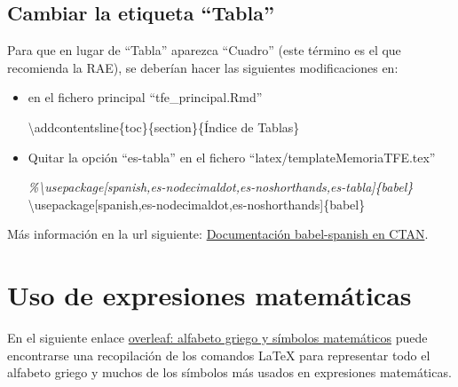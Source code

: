 \documentclass[12pt,a4paper,]{book}
\newenvironment{Shaded}{\begin{snugshade}}{\end{snugshade}}
\newcommand{\BuiltInTok}[1]{#1}
\newcommand{\CommentTok}[1]{\textcolor[rgb]{0.56,0.35,0.01}{\textit{#1}}}
\newcommand{\ExtensionTok}[1]{#1}
\newcommand{\FunctionTok}[1]{\textcolor[rgb]{0.00,0.00,0.00}{#1}}
\newcommand{\NormalTok}[1]{#1}
\numberwithin{dummy}{section}
\theoremstyle{ocrenumbox}
\theoremstyle{blacknumex}
\theoremstyle{blacknumbox}
\theoremstyle{ocrenum}
\theoremstyle{ocrenum}
\begin{document}
\clearpage

\hypertarget{cambiar-la-etiqueta-tabla}{%
\subsection{Cambiar la etiqueta
``Tabla''}\label{cambiar-la-etiqueta-tabla}}

Para que en lugar de ``Tabla'' aparezca ``Cuadro'' (este término es el
que recomienda la RAE), se deberían hacer las siguientes modificaciones
en:

\begin{itemize}
\item
  en el fichero principal ``tfe\_principal.Rmd''

\begin{Shaded}
\begin{Highlighting}[]
\FunctionTok{\textbackslash{}addcontentsline}\NormalTok{\{toc\}\{section\}\{Índice de Tablas\}}
\end{Highlighting}
\end{Shaded}
\item
  Quitar la opción ``es-tabla'' en el fichero
  ``latex/templateMemoriaTFE.tex''

\begin{Shaded}
\begin{Highlighting}[]
\CommentTok{\%\textbackslash{}usepackage[spanish,es{-}nodecimaldot,es{-}noshorthands,es{-}tabla]\{babel\}}
\BuiltInTok{\textbackslash{}usepackage}\NormalTok{[spanish,es{-}nodecimaldot,es{-}noshorthands]\{}\ExtensionTok{babel}\NormalTok{\}}
\end{Highlighting}
\end{Shaded}
\end{itemize}

Más información en la url siguiente:
\href{https://osl.ugr.es/CTAN/macros/latex/contrib/babel-contrib/spanish/spanish.pdf}{Documentación
babel-spanish en CTAN}.

\hypertarget{uso-de-expresiones-matemuxe1ticas}{%
\section{Uso de expresiones
matemáticas}\label{uso-de-expresiones-matemuxe1ticas}}

En el siguiente enlace
\href{https://www.overleaf.com/learn/latex/List_of_Greek_letters_and_math_symbols}{overleaf:
alfabeto griego y símbolos matemáticos} puede encontrarse una
recopilación de los comandos LaTeX para representar todo el alfabeto
griego y muchos de los símbolos más usados en expresiones matemáticas.
\end{document}
